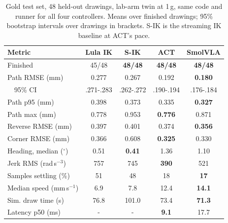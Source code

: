 \documentclass[conference]{IEEEtran}
\begin{document}
\begin{table}[t]
\centering
\caption{Gold test set, 48 held-out drawings, lab-arm twin at 1\,g, same code and runner for all four
controllers. Means over finished drawings; 95\% bootstrap intervals over drawings in brackets. S-IK is the
streaming IK baseline at ACT's pace.}
\label{tab:gold}
\setlength{\tabcolsep}{2.2pt}
\footnotesize
\begin{tabular}{lcccc}
\toprule
Metric & Lula IK & S-IK & ACT & SmolVLA \\
\midrule
Finished & 45/48 & \textbf{48/48} & \textbf{48/48} & \textbf{48/48} \\
Path RMSE (mm) & 0.277 & 0.267 & 0.192 & \textbf{0.180} \\
\ \ 95\% CI & .271-.283 & .262-.272 & .190-.194 & .176-.184 \\
Path p95 (mm) & 0.398 & 0.373 & 0.335 & \textbf{0.327} \\
Path max (mm) & 0.778 & 0.953 & \textbf{0.776} & 0.871 \\
Reverse RMSE (mm) & 0.397 & 0.401 & 0.374 & \textbf{0.356} \\
Corner RMSE (mm) & 0.366 & 0.608 & \textbf{0.325} & 0.330 \\
Heading, median ($^\circ$) & 0.51 & \textbf{0.41} & 1.36 & 1.10 \\
Jerk RMS (rad\,s$^{-3}$) & 757 & 745 & \textbf{390} & 521 \\
Samples settling (\%) & 51 & 48 & 18 & \textbf{17} \\
Median speed (mm\,s$^{-1}$) & 6.9 & 7.8 & 12.4 & \textbf{14.1} \\
Sim. draw time (s) & 76.8 & 101.0 & 73.4 & \textbf{71.3} \\
Latency p50 (ms) & - & - & \textbf{9.1} & 17.7 \\
\bottomrule
\end{tabular}
\end{table}
\end{document}

